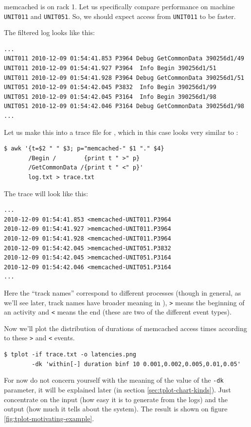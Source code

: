 \documentclass{article}
\begin{document}
memcached is on rack 1. Let us specifically compare performance on machine \verb|UNIT011| and \verb|UNIT051|. So, we should expect access from \verb|UNIT011| to be faster.

The filtered log looks like this:
\begin{verbatim}
...
UNIT011 2010-12-09 01:54:41.853 P3964 Debug GetCommonData 390256d1/49
UNIT011 2010-12-09 01:54:41.927 P3964  Info Begin 390256d1/51
UNIT011 2010-12-09 01:54:41.928 P3964 Debug GetCommonData 390256d1/51
UNIT051 2010-12-09 01:54:42.045 P3832  Info Begin 390256d1/99
UNIT051 2010-12-09 01:54:42.045 P3164  Info Begin 390256d1/98
UNIT051 2010-12-09 01:54:42.046 P3164 Debug GetCommonData 390256d1/98
...
\end{verbatim}

Let us make this into a trace file for \timeplot{}, which in this case looks very similar to \splot{}:
\begin{verbatim}
$ awk '{t=$2 " " $3; p="memcached-" $1 "." $4}
       /Begin /        {print t " >" p} 
       /GetCommonData /{print t " <" p}'
       log.txt > trace.txt
\end{verbatim}

The trace will look like this:
\begin{verbatim}
...
2010-12-09 01:54:41.853 <memcached-UNIT011.P3964
2010-12-09 01:54:41.927 >memcached-UNIT011.P3964
2010-12-09 01:54:41.928 <memcached-UNIT011.P3964
2010-12-09 01:54:42.045 >memcached-UNIT051.P3832
2010-12-09 01:54:42.045 >memcached-UNIT051.P3164
2010-12-09 01:54:42.046 <memcached-UNIT051.P3164
...
\end{verbatim}

Here the ``track names'' correspond to different processes (though in general, as we'll see later, track names have broader meaning in \timeplot{}), \verb|>| means the beginning of an activity and \verb|<| means the end (these are two of the different event types).

Now we'll plot the distribution of durations of memcached access times according to these \verb|>| and \verb|<| events.

\begin{verbatim}
$ tplot -if trace.txt -o latencies.png
        -dk 'within[-] duration binf 10 0.001,0.002,0.005,0.01,0.05'
\end{verbatim}

For now do not concern yourself with the meaning of the value of the \verb|-dk| parameter, it will be explained later (in section \ref{sec:tplot-chart-kinds}). Just concentrate on the input (how easy it is to generate from the logs) and the output (how much it tells about the system). The result is shown on figure \ref{fig:tplot-motivating-example}.
\end{document}
